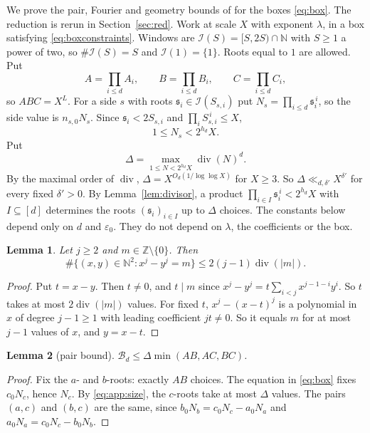\documentclass{amsart}
\newtheorem{lemma}{Lemma}[section]
\theoremstyle{definition}
\theoremstyle{plain}
\numberwithin{equation}{section}
\numberwithin{table}{section}
\newcommand{\Z}{\mathbb{Z}}
\newcommand{\N}{\mathbb{N}}
\begin{document}
We prove the pair, Fourier and geometry bounds of
\cite[Propositions~2.3, 3.1 and~4.1]{BBLT} for the boxes \eqref{eq:box}.
The reduction \cite[Proposition~2.1]{BBLT} is rerun in
Section~\ref{sec:red}. Work at scale $X$ with exponent $\lambda$, in a box
satisfying \eqref{eq:boxconstraints}. Windows are $\mathcal I(S)=[S,2S)\cap\N$
with $S\ge1$ a power of two, so $\#\mathcal I(S)=S$ and $\mathcal I(1)=\{1\}$.
Roots equal to $1$ are allowed. Put
\[
 A=\prod_{i\le d}A_i,\qquad B=\prod_{i\le d}B_i,\qquad C=\prod_{i\le d}C_i,
\]
so $ABC=X^L$. For a side $s$ with roots $\mathfrak s_i\in\mathcal I(S_{s,i})$
put $N_s=\prod_{i\le d}\mathfrak s_i^{\,i}$, so the side value is
$n_{s,0}N_s$. Since $\mathfrak s_i<2S_{s,i}$ and
$\prod_iS_{s,i}^{\,i}\le X$,
\begin{equation}\label{eq:app:size}
 1\le N_s<2^{h_d}X .
\end{equation}
Put
\[
 \Delta=\max_{1\le N<2^{h_d}X}\operatorname{div}(N)^d .
\]
By the maximal order of $\operatorname{div}$,
$\Delta=X^{O_d(1/\log\log X)}$ for $X\ge3$. So $\Delta\ll_{d,\delta'}X^{\delta'}$
for every fixed $\delta'>0$. By Lemma~\ref{lem:divisor}, a product
$\prod_{i\in I}\mathfrak s_i^{\,i}<2^{h_d}X$ with $I\subseteq[d]$ determines
the roots $(\mathfrak s_i)_{i\in I}$ up to $\Delta$ choices. The constants
below depend only on $d$ and $\varepsilon_0$. They do not depend on
$\lambda$, the coefficients or the box.

\begin{lemma}\label{lem:app:power}
Let $j\ge2$ and $m\in\Z\setminus\{0\}$. Then
\[
 \#\{(x,y)\in\N^2:x^j-y^j=m\}\le2(j-1)\operatorname{div}(|m|).
\]
\end{lemma}

\begin{proof}
Put $t=x-y$. Then $t\ne0$, and $t\mid m$ since
$x^j-y^j=t\sum_{i<j}x^{j-1-i}y^i$. So $t$ takes at most
$2\operatorname{div}(|m|)$ values. For fixed $t$,
$x^j-(x-t)^j$ is a polynomial in $x$ of degree $j-1\ge1$ with leading
coefficient $jt\ne0$. So it equals $m$ for at most $j-1$ values of $x$, and
$y=x-t$.
\end{proof}

\begin{lemma}[pair bound]\label{lem:app:pair}
$\mathcal B_d\le\Delta\min(AB,AC,BC)$.
\end{lemma}

\begin{proof}
Fix the $a$- and $b$-roots: exactly $AB$ choices. The equation in
\eqref{eq:box} fixes $c_0N_c$, hence $N_c$. By \eqref{eq:app:size}, the
$c$-roots take at most $\Delta$ values. The pairs $(a,c)$ and $(b,c)$ are
the same, since $b_0N_b=c_0N_c-a_0N_a$ and $a_0N_a=c_0N_c-b_0N_b$.
\end{proof}
\end{document}
